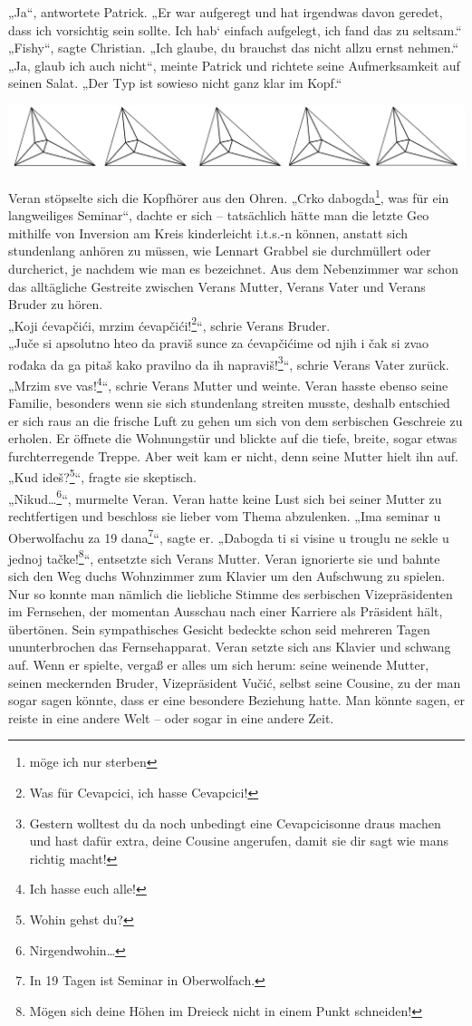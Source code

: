 \documentclass[oneside]{memoir}
\newcommand{\parasep}{
\bigskip
\bigskip
\begin{center} 
   \includegraphics[scale=.08]{parasep5.jpg} 
\end{center}
\bigskip
\bigskip
}
\begin{document}
„Ja“, antwortete Patrick. „Er war aufgeregt und hat irgendwas davon geredet, dass ich vorsichtig sein sollte. Ich hab‘ einfach aufgelegt, ich fand das zu seltsam.“ \\
„Fishy“, sagte Christian. „Ich glaube, du brauchst das nicht allzu ernst nehmen.“ \\
„Ja, glaub ich auch nicht“, meinte Patrick und richtete seine Aufmerksamkeit auf seinen Salat. „Der Typ ist sowieso nicht ganz klar im Kopf.“

\parasep

Veran stöpselte sich die Kopfhörer aus den Ohren. „Crko dabogda\footnote{möge ich nur sterben}, was für ein langweiliges Seminar“, dachte er sich -- tatsächlich hätte man die letzte Geo mithilfe von Inversion am Kreis kinderleicht i.t.s.-n können, anstatt sich stundenlang anhören zu müssen, wie Lennart Grabbel sie durchmüllert oder durcherict, je nachdem wie man es bezeichnet. Aus dem Nebenzimmer war schon das alltägliche Gestreite zwischen Verans Mutter, Verans Vater und Verans Bruder zu hören. \\
„Koji ćevapčići, mrzim ćevapčići!\footnote{Was für Cevapcici, ich hasse Cevapcici!}“, schrie Verans Bruder. \\
„Juče si apsolutno hteo da praviš sunce za ćevapčićime od njih i čak si zvao rođaka da ga pitaš kako pravilno da ih napraviš!\footnote{Gestern wolltest du da noch unbedingt eine Cevapcicisonne draus machen und hast dafür extra, deine Cousine angerufen, damit sie dir sagt wie mans richtig macht!}“, schrie Verans Vater zurück. \\
„Mrzim sve vas!\footnote{Ich hasse euch alle!}“, schrie Verans Mutter und weinte. Veran hasste ebenso seine Familie, besonders wenn sie sich stundenlang streiten musste, deshalb entschied er sich raus an die frische Luft zu gehen um sich von dem serbischen Geschreie zu erholen. Er öffnete die Wohnungstür und blickte auf die tiefe, breite, sogar etwas furchterregende Treppe. Aber weit kam er nicht, denn seine Mutter hielt ihn auf. \\
„Kud ideš?\footnote{Wohin gehst du?}“, fragte sie skeptisch. \\
„Nikud\ldots\footnote{Nirgendwohin\ldots}“, murmelte Veran. Veran hatte keine Lust sich bei seiner Mutter zu rechtfertigen und beschloss sie lieber vom Thema abzulenken. „Ima seminar u Oberwolfachu za 19 dana\footnote{In 19 Tagen ist Seminar in Oberwolfach.}“, sagte er. „Dabogda ti si visine u trouglu ne sekle u jednoj tačke!\footnote{Mögen sich deine Höhen im Dreieck nicht in einem Punkt schneiden!}“, entsetzte sich Verans Mutter. Veran ignorierte sie und bahnte sich den Weg duchs Wohnzimmer zum Klavier um den Aufschwung zu spielen. Nur so konnte man nämlich die liebliche Stimme des serbischen Vizepräsidenten im Fernsehen, der momentan Ausschau nach einer Karriere als Präsident hält, übertönen. Sein sympathisches Gesicht bedeckte schon seid mehreren Tagen ununterbrochen das Fernsehapparat. Veran setzte sich ans Klavier und schwang auf. Wenn er spielte, vergaß er alles um sich herum: seine weinende Mutter, seinen meckernden Bruder, Vizepräsident Vučić, selbst seine Cousine, zu der man sogar sagen könnte, dass er eine besondere Beziehung hatte. Man könnte sagen, er reiste in eine andere Welt -- oder sogar in eine andere Zeit.
\end{document}
